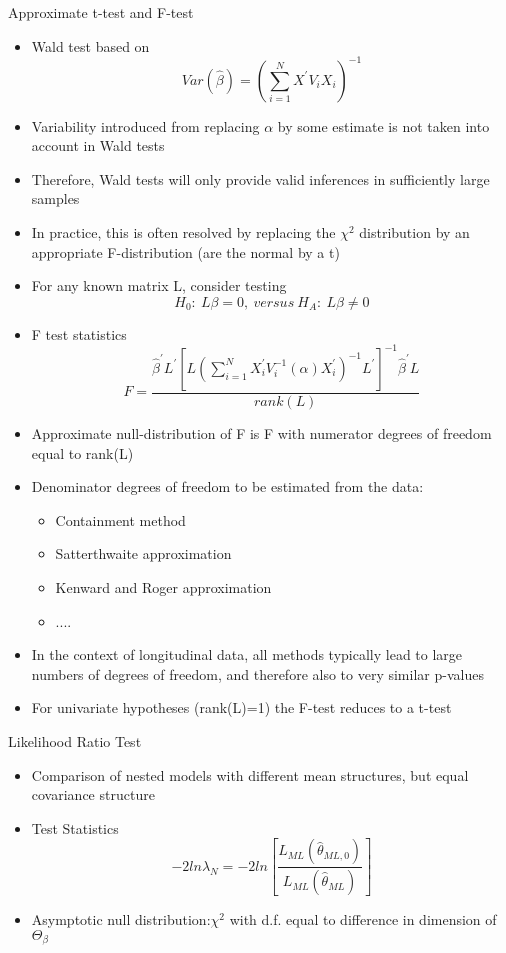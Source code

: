 \documentclass{beamer}
\begin{document}
\begin{frame}{Approximate t-test and F-test}
\begin{itemize}
	\item Wald test based on
	\[Var(\hat{\beta})=\left(\sum_{i=1}^{N}X^{'}V_iX_i\right)^{-1} \]
	\item Variability introduced from replacing $\alpha$ by some estimate is not taken into account in Wald tests
	\item Therefore, Wald tests will only provide valid inferences in sufficiently large samples
	\item In practice, this is often resolved by replacing the $\chi^2$  distribution by an appropriate F-distribution (are the normal by a t)
	\item For any known matrix L, consider testing
		\[H_0:\:L\beta=0, \: versus \: H_A: \: L\beta \ne 0	\]
\end{itemize}
\end{frame}

\begin{frame}
\begin{itemize}
	\item F test statistics
	\[F=\frac{\hat{\beta}^{'}L^{'} \left[L\left(\sum_{i=1}^{N}X^{'}_iV^{-1}_i(\alpha)X^{'}_i\right)^{-1}L^{'}\right]^{-1}\hat{\beta}^{'}L}{rank(L)}
	\]
	\item Approximate null-distribution of F is F with numerator degrees of freedom equal
	to rank(L)
	\item Denominator degrees of freedom to be estimated from the data:
	\begin{itemize}
		\item Containment method
		\item Satterthwaite approximation
		\item Kenward and Roger approximation
		\item ....
	\end{itemize}
\item In the context of longitudinal data, all methods typically lead to large numbers of degrees of freedom, and therefore also to very similar p-values
\item For univariate hypotheses (rank(L)=1) the F-test reduces to a t-test
\end{itemize}
\end{frame}

\begin{frame}{Likelihood Ratio Test}
\begin{itemize}
	\item Comparison of nested models with different mean structures, but equal covariance structure
	\item Test Statistics
	\[-2ln\lambda_N=-2ln\left[\frac{L_{ML}(\hat{\theta}_{ML,0})}{L_{ML}(\hat{\theta}_{ML})}\right] \]
	\item Asymptotic null distribution:$\chi^2$ with d.f. equal to difference in dimension of $\Theta_{\beta}$
\end{itemize}
\end{frame}
\end{document}
